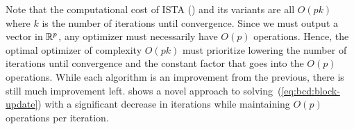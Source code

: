 %

Note that the computational cost of 
ISTA () and its variants
are all $O(p k)$ where $k$ is the number of iterations until convergence.
Since we must output a vector in $\mathbb{R}^p$, 
any optimizer must necessarily have $O(p)$ operations.
Hence, the optimal optimizer of complexity $O(pk)$ must prioritize lowering 
the number of iterations until convergence and the constant factor that goes into the $O(p)$ operations.
While each algorithm is an improvement from the previous,
there is still much improvement left.
 shows a novel approach to solving~(\ref{eq:bcd:block-update})
with a significant decrease in iterations 
while maintaining $O(p)$ operations per iteration.

